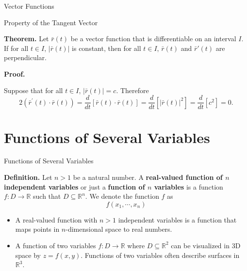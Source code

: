 \documentclass[aspectratio=169, UTF8]{ctexbeamer}
\begin{document}
    \begin{frame}[t]{Vector Functions}
        \begin{block}{Property of the Tangent Vector}
            \par \textbf{Theorem.} Let $\bar{r} (t)$ be a vector function that is differentiable on an interval $I$. If for all $t \in I$, $|\bar{r} (t) |$ is constant, then for all $t \in I$, $\bar{r}(t)$ and $\bar{r}'(t)$ are perpendicular. 
        \end{block}

        \phantom{zjy}

        \par \textbf{Proof.} 
        \par Suppose that for all $t \in I$, $|\bar{r} (t)| = c$. Therefore 
        \begin{equation*}
            2\left(\bar{r}^{\prime}(t) \cdot \bar{r}(t)\right)=\frac{d}{d t}[\bar{r}(t) \cdot \bar{r}(t)]=\frac{d}{d t}\left[|\bar{r}(t)|^{2}\right]=\frac{d}{d t}\left[c^{2}\right]=0 .
        \end{equation*}
    \end{frame}


\section{Functions of Several Variables}
    \begin{frame}[label=5]{Functions of Several Variables}
        \begin{block}
            \par \textbf{Definition.} Let $n > 1$ be a natural number. A \textbf{real-valued function of $n$ independent variables} or just a \textbf{function of $n$ variables} is a function $f: D \to \mathbb{R}$ such that $D \subseteq \mathbb{R}^n$. We denote the function $f$ as 
            \begin{equation*}
                f(x_1, \cdots, x_n)
            \end{equation*}
        \end{block}
        

        
        \begin{itemize}
            \item  A real-valued function with $n > 1$ independent variables is a function that maps points in $n$-dimensional space to real numbers.
            \item  A function of two variables $f: D \to \mathbb{R}$ where $D \subseteq \mathbb{R}^2$ can be visualized in 3D space by $z = f(x,y)$. Functions of two variables often describe surfaces in $\mathbb{R}^3$.
        \end{itemize}
    \end{frame}
\end{document}
